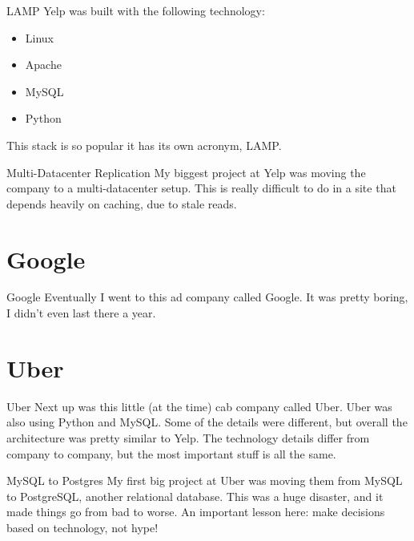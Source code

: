 \documentclass[14pt]{beamer}
\begin{document}
\begin{frame}{LAMP}
  Yelp was built with the following technology:
  \begin{itemize}
  \item Linux
  \item Apache
  \item MySQL
  \item Python
  \end{itemize}
  This stack is so popular it has its own acronym, LAMP.
\end{frame}

\begin{frame}{Multi-Datacenter Replication}
  My biggest project at Yelp was moving the company to a multi-datacenter setup.
  \newline
  \newline
  This is really difficult to do in a site that depends heavily on caching, due
  to stale reads.
\end{frame}

\section{Google}

\begin{frame}{Google}
  Eventually I went to this ad company called Google.
  \newline
  \newline
  It was pretty boring, I didn't even last there a year.
\end{frame}

\section{Uber}

\begin{frame}{Uber}
  Next up was this little (at the time) cab company called Uber.
  \newline
  \newline
  Uber was also using Python and MySQL. Some of the details were different, but
  overall the architecture was pretty similar to Yelp.
  \newline
  \newline
  The technology details differ from company to company, but the most important
  stuff is all the same.
\end{frame}

\begin{frame}{MySQL to Postgres}
  My first big project at Uber was moving them from MySQL to PostgreSQL, another
  relational database.
  \newline
  \newline
  This was a huge disaster, and it made things go from bad to worse. An
  important lesson here: make decisions based on technology, not hype!
\end{frame}
\end{document}
